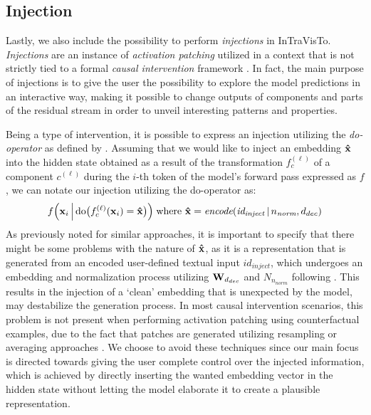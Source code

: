 \subsection{Injection}\label{ssec:method_intravisto_injection}

Lastly, we also include the possibility to perform \emph{injections} in InTraVisTo.
\emph{Injections} are an instance of \emph{activation patching}  utilized in a context that is not strictly tied to a formal \emph{causal intervention} framework  .
In fact, the main purpose of injections is to give the user the possibility to explore the model predictions in an interactive way, making it possible to change outputs of components and parts of the residual stream in order to unveil interesting patterns and properties.

Being a type of intervention, it is possible to express an injection utilizing the \emph{do-operator} as defined by .
Assuming that we would like to inject an embedding $\bm{\mathbf{\hat x}}$ into the hidden state obtained as a result of the transformation $f_c^{(\ell)}$ of a component $c^{(\ell)}$ during the $i$-th token of the model's forward pass expressed as $f$, we can notate our injection utilizing the do-operator as:
\begin{equation}
    \label{eq:method_intravisto_injection}
    f\Bigl(\bm{\mathbf{x}}_i \, \Big| \, \text{do}\bigl(f_c^{(\ell)}(\bm{\mathbf{x}}_i) = \bm{\mathbf{\hat x}}\bigr)\Bigr)
    \; \text{where}\ \bm{\mathbf{\hat x}} = \textit{encode}(\textit{id}_{\textit{inject}} \,|\, n_\textit{norm}, d_{dec})
\end{equation}
As previously noted for similar approaches, it is important to specify that there might be some problems with the nature of $\bm{\mathbf{\hat x}}$, as it is a representation that is generated from an encoded user-defined textual input ${id}_{\textit{inject}}$, which undergoes an embedding and normalization process utilizing $\bm{\mathbf{W}}_{d_{dec}}$ and $N_{n_\textit{norm}}$ following .
This results in the injection of a `clean' embedding that is unexpected by the model,  may destabilize the generation process.
In most causal intervention scenarios, this problem is not present when performing activation patching using counterfactual examples, due to the fact that patches are generated utilizing resampling or averaging approaches .
We choose to avoid these techniques since our main focus is directed towards giving the user complete control over the injected information, which is achieved by directly inserting the wanted embedding vector in the hidden state without letting the model elaborate it to create a plausible representation.

